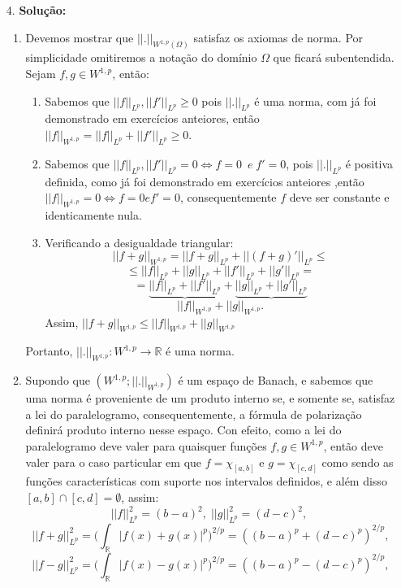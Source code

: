 \documentclass{article}
\begin{document}
\begin{enumerate}
		\item[4.] \textbf{Solução:}
			\begin{enumerate}
				\item Devemos mostrar que $||.||_{W^{1,p}(\Omega)}$ satisfaz os axiomas de norma. Por simplicidade omitiremos a notação do domínio $\Omega$ que ficará subentendida. Sejam $f, g \in W^{1,p}$, então:
				\begin{enumerate}
					\item Sabemos que  $||f||_{L^{p}}, ||f'||_{L^{p}} \geq 0$ pois $||.||_{L^{p}}$ é uma norma, com já foi demonstrado em exercícios anteiores, então $||f||_{W^{1,p}} = ||f||_{L^{p}} + ||f'||_{L^{p}} \geq 0$.
					
					\item Sabemos que $||f||_{L^{p}}, ||f'||_{L^{p}} = 0 \iff f=0 \;\ e \; f'=0$, pois $||.||_{L^{p}}$ é positiva definida, como já foi demonstrado em exercícios anteiores ,então $||f||_{W^{1,p}} = 0 \iff f = 0 e f' =0$, consequentemente $f$ deve ser constante e identicamente nula.
					
					\item Verificando a desigualdade triangular: 
					$$
					||f + g||_{W^{1,p}} =  ||f+g||_{L^{p}} + ||(f + g)'||_{L^{p}} \leq
					$$
					$$ \leq ||f||_{L^{p}}+||g||_{L^{p}}+||f'||_{L^{p}}+||g'||_{L^{p}} =  
					$$
					$$
					=\underbrace{||f||_{L^{p}}+||f'||_{L^{p}}} + \underbrace{||g||_{L^{p}}+||g'||_{L^{p}}}
					$$
					$$
					||f ||_{W^{1,p}}+|| g||_{W^{1,p}}.
					$$ 
					Assim, $||f + g||_{W^{1,p}} \leq ||f ||_{W^{1,p}}+|| g||_{W^{1,p}}$
					
				\end{enumerate}
				Portanto, $||. ||_{W^{1,p}}: W^{1,p} \to \mathbb{R}$ é uma norma.
				
				\item Supondo que $(W^{1,p};||. ||_{W^{1,p}})$ é um espaço de Banach, e sabemos que uma norma é proveniente de um produto interno se, e somente se, satisfaz a lei do paralelogramo, consequentemente, a fórmula de polarização definirá produto interno nesse espaço. Con efeito, como a lei do paralelogramo deve valer para quaisquer funções $f, g \in W^{1,p}$, então deve valer para o caso particular em que $f = \chi_{[a,b]}$ e $g = \chi_{[c,d]}$ como sendo as funções características com suporte nos intervalos definidos, e além disso $[a,b] \cap [c,d] = \emptyset$, assim: 
				$$
				||f||_{L^{p}}^{2} = (b-a)^{2}, \; 				||g||_{L^{p}}^{2} = (d-c)^{2}, \; 
				$$
				$$
				||f +g||_{L^{p}}^{2} = \Big (\int_{\mathbb{R}}|f(x)+g(x)|^{p} \Big)^{2/p} =((b-a)^{p}+(d-c)^{p})^{2/p},
				$$
				$$
				||f -g||_{L^{p}}^{2} = \Big (\int_{\mathbb{R}}|f(x)-g(x)|^{p} \Big)^{2/p} =((b-a)^{p}-(d-c)^{p})^{2/p},
				$$
				

\end{enumerate}
\end{enumerate}
\end{document}
